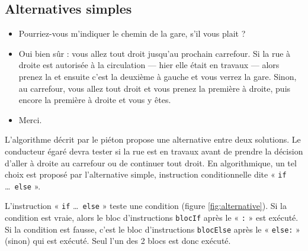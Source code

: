 \subsection{Alternatives simples}\label{sub:alternative}
\begin{ex}\label{ex:chemin}
\begin{itemize}
\item Pourriez-vous m'indiquer le chemin de la gare, s'il vous plait ?
\item Oui bien sûr : vous allez tout droit jusqu'au prochain carrefour.
	Si la rue à droite est autorisée à la circulation --- hier elle était en travaux --- 
	alors prenez la et ensuite c'est
	la deuxième à gauche et vous verrez la gare. Sinon, au carrefour, vous allez tout droit 
	et vous prenez la
	première à droite, puis encore la première à droite et vous y êtes.
\item Merci.
\end{itemize}
\end{ex}
\noindent L'algorithme décrit par le piéton propose une alternative entre deux solutions.
Le conducteur égaré devra tester si la rue est en travaux avant de prendre la décision 
d'aller à droite au carrefour ou de continuer tout droit. En algorithmique, un tel
choix est proposé par l'alternative simple, instruction conditionnelle
dite « {\tt if} \ldots\ {\tt else} ».

L'instruction « {\tt if} \ldots\ {\tt else} » teste une condition (figure \ref{fig:alternative}). 
Si la condition
est vraie, alors le bloc d'instructions {\tt blocIf} après le « {\tt :} » est exécuté.
Si la condition est fausse, c'est le bloc d'instructions {\tt blocElse} après le « {\tt else:} » 
(sinon) qui est exécuté. Seul l'un des 2 blocs est donc exécuté.

